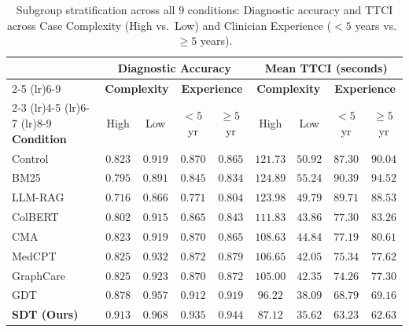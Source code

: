 \documentclass[12pt]{article}
\begin{document}
\begin{table}[h!]
  \centering
  \caption{Subgroup stratification across all 9 conditions: Diagnostic accuracy and TTCI across Case Complexity (High vs.\ Low) and Clinician Experience ($<5$ years vs.\ $\ge 5$ years).}
  \label{tab:subgroup_results}
  \small
  \begin{tabular}{@{}lcccccccc@{}}
    \toprule
    & \multicolumn{4}{c}{\textbf{Diagnostic Accuracy}} & \multicolumn{4}{c}{\textbf{Mean TTCI (seconds)}} \\
    \cmidrule(lr){2-5} \cmidrule(lr){6-9}
    & \multicolumn{2}{c}{\textbf{Complexity}} & \multicolumn{2}{c}{\textbf{Experience}} & \multicolumn{2}{c}{\textbf{Complexity}} & \multicolumn{2}{c}{\textbf{Experience}} \\
    \cmidrule(lr){2-3} \cmidrule(lr){4-5} \cmidrule(lr){6-7} \cmidrule(lr){8-9}
    \textbf{Condition} & High & Low & $<5$\,yr & $\ge 5$\,yr & High & Low & $<5$\,yr & $\ge 5$\,yr \\
    \midrule
    Control   & $0.823$ & $0.919$ & $0.870$ & $0.865$ & $121.73$ & $50.92$ & $87.30$ & $90.04$ \\
    BM25      & $0.795$ & $0.891$ & $0.845$ & $0.834$ & $124.89$ & $55.24$ & $90.39$ & $94.52$ \\
    LLM-RAG   & $0.716$ & $0.866$ & $0.771$ & $0.804$ & $123.98$ & $49.79$ & $89.71$ & $88.53$ \\
    ColBERT   & $0.802$ & $0.915$ & $0.865$ & $0.843$ & $111.83$ & $43.86$ & $77.30$ & $83.26$ \\
    CMA       & $0.823$ & $0.919$ & $0.870$ & $0.865$ & $108.63$ & $44.84$ & $77.19$ & $80.61$ \\
    MedCPT    & $0.825$ & $0.932$ & $0.872$ & $0.879$ & $106.65$ & $42.05$ & $75.34$ & $77.62$ \\
    GraphCare & $0.825$ & $0.923$ & $0.870$ & $0.872$ & $105.00$ & $42.35$ & $74.26$ & $77.30$ \\
    GDT       & $0.878$ & $0.957$ & $0.912$ & $0.919$ & $96.22$  & $38.09$ & $68.79$ & $69.16$ \\
    \textbf{SDT (Ours)} & $\mathbf{0.913}$ & $\mathbf{0.968}$ & $\mathbf{0.935}$ & $\mathbf{0.944}$ & $\mathbf{87.12}$ & $\mathbf{35.62}$ & $\mathbf{63.23}$ & $\mathbf{62.63}$ \\
    \bottomrule
  \end{tabular}
\end{table}

\vspace{1cm}
\end{document}
